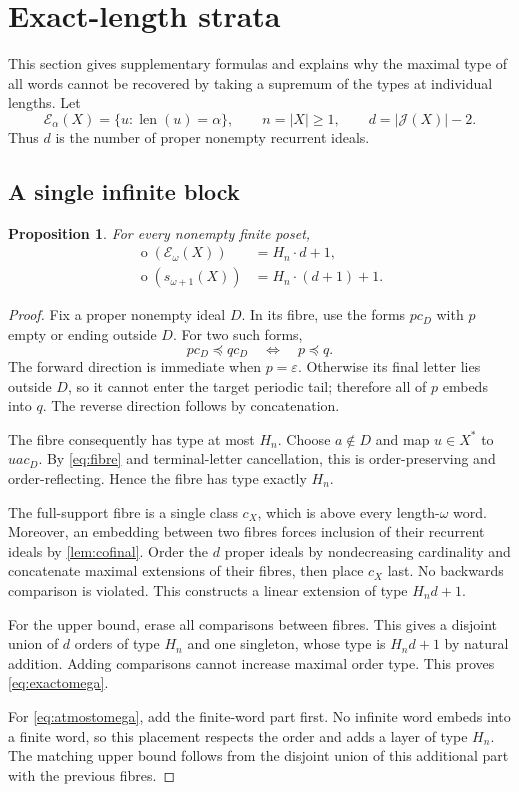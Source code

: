 \documentclass[11pt]{article}
\numberwithin{equation}{section}
\theoremstyle{plain}
\newtheorem{proposition}[proposition]{Proposition}
\theoremstyle{definition}
\theoremstyle{remark}
\newcommand{\ot}{\operatorname{o}}
\newcommand{\J}{\mathcal J}
\newcommand{\E}{\mathcal E}
\newcommand{\HH}{H}
\newcommand{\emp}{\varepsilon}
\newcommand{\len}{\operatorname{len}}
\newcommand{\sub}{\preccurlyeq}
\begin{document}
\section{Exact-length strata}\label{sec:exact}

This section gives supplementary formulas and explains why the maximal type of all words cannot be recovered by taking a supremum of the types at individual lengths. Let
\[
 \E_\alpha(X)=\{u:\len(u)=\alpha\},
 \qquad n=|X|\geq1,
 \qquad d=|\J(X)|-2.
\]
Thus $d$ is the number of proper nonempty recurrent ideals.

\subsection{A single infinite block}

\begin{proposition}\label{prop:exactomega}
For every nonempty finite poset,
\begin{align}
 \ot(\E_\omega(X))&=\HH_n\cdot d+1,\label{eq:exactomega}\\
 \ot(s_{\omega+1}(X))&=\HH_n\cdot(d+1)+1.\label{eq:atmostomega}
\end{align}
\end{proposition}
\begin{proof}
Fix a proper nonempty ideal $D$. In its fibre, use the forms $p c_D$ with $p$ empty or ending outside $D$. For two such forms,
\begin{equation}\label{eq:fibre}
 p c_D\sub q c_D\quad\Longleftrightarrow\quad p\sub q.
\end{equation}
The forward direction is immediate when $p=\emp$. Otherwise its final letter lies outside $D$, so it cannot enter the target periodic tail; therefore all of $p$ embeds into $q$. The reverse direction follows by concatenation.

The fibre consequently has type at most $\HH_n$. Choose $a\notin D$ and map $u\in X^*$ to $ua c_D$. By \eqref{eq:fibre} and terminal-letter cancellation, this is order-preserving and order-reflecting. Hence the fibre has type exactly $\HH_n$.

The full-support fibre is a single class $c_X$, which is above every length-$\omega$ word. Moreover, an embedding between two fibres forces inclusion of their recurrent ideals by \cref{lem:cofinal}. Order the $d$ proper ideals by nondecreasing cardinality and concatenate maximal extensions of their fibres, then place $c_X$ last. No backwards comparison is violated. This constructs a linear extension of type $\HH_n d+1$.

For the upper bound, erase all comparisons between fibres. This gives a disjoint union of $d$ orders of type $\HH_n$ and one singleton, whose type is $\HH_n d+1$ by natural addition. Adding comparisons cannot increase maximal order type. This proves \eqref{eq:exactomega}.

For \eqref{eq:atmostomega}, add the finite-word part first. No infinite word embeds into a finite word, so this placement respects the order and adds a layer of type $\HH_n$. The matching upper bound follows from the disjoint union of this additional part with the previous fibres.
\end{proof}
\end{document}
